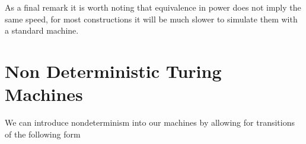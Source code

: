 \documentclass[11pt]{exam}
\begin{document}
As a final remark it is worth noting that equivalence in power does not imply the same speed, for most constructions it will be much slower
to simulate them with a standard machine.

\newpage 

\section{Non Deterministic Turing Machines}

We can introduce nondeterminism into our machines by allowing for transitions of the following form\\

\begin{center}
\\
\end{center}
\end{document}

